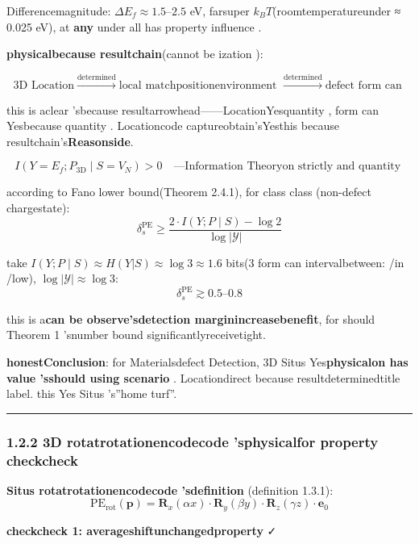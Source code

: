 \documentclass[
  12pt,
]{article}
\begin{document}
Differencemagnitude: \(\Delta E_f \approx 1.5\)--\(2.5\) eV, farsuper \(k_B T\)(roomtemperatureunder 
≈ 0.025 eV), at \textbf{any }under all has property influence . 

\textbf{physicalbecause resultchain}(cannot be ization ):

\[\text{3D Location} \xrightarrow{\text{determined}} \text{local matchpositionenvironment } \xrightarrow{\text{determined}} \text{defect form can }\]

this is aclear 'sbecause resultarrowhead------LocationYesquantity , form can Yesbecause quantity . Locationcode captureobtain'sYesthis because resultchain's\textbf{Reasonside}. 

\[I(Y = E_f; P_{\text{3D}} \mid S = V_N) > 0 \quad \text{---Information Theoryon strictly and quantity }\]

according to  Fano lower bound(Theorem 2.4.1), for class class (non-defect chargestate):
\[\delta_s^{\text{PE}} \geq \frac{2 \cdot I(Y; P \mid S) - \log 2}{\log |\mathcal{Y}|}\]

take \(I(Y; P \mid S) \approx H(Y|S) \approx \log 3 \approx 1.6\) bits(3
form can intervalbetween: /in /low), \(\log |\mathcal{Y}| \approx \log 3\): 
\[\delta_s^{\text{PE}} \gtrsim 0.5 \text{–}0.8\]

this is a\textbf{can be observe'sdetection marginincreasebenefit}, for should  Theorem 1 'snumber bound significantlyreceivetight. 

\textbf{honestConclusion}: for Materialsdefect Detection, 3D Situs
Yes\textbf{physicalon has value 'sshould using scenario }. Locationdirect because resultdeterminedtitle label. this Yes Situs
's''home turf''. 

\begin{center}\rule{0.5\linewidth}{0.5pt}\end{center}

\subsubsection{1.2.2 3D
rotatrotationencodecode 'sphysicalfor property checkcheck}\label{d-ux65cbux8f6cux7f16ux7801ux7684ux7269ux7406ux5bf9ux79f0ux6027ux68c0ux67e5}

\textbf{Situs rotatrotationencodecode 'sdefinition }(definition  1.3.1):
\[\text{PE}_{\text{rot}}(\mathbf{p}) = \mathbf{R}_x(\alpha x) \cdot \mathbf{R}_y(\beta y) \cdot \mathbf{R}_z(\gamma z) \cdot \mathbf{e}_0\]

\textbf{checkcheck 1: averageshiftunchangedproperty } ✓
\end{document}
